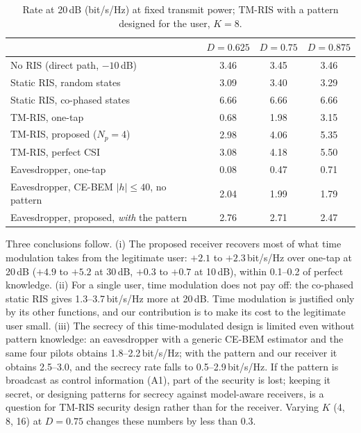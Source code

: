 \begin{table}[!htbp]\centering
\caption{Rate at 20\,dB (bit/s/Hz) at fixed transmit power; TM-RIS with a pattern designed for the user, $K=8$.}\label{tab:motiv}
\begin{tabular}{lccc}\toprule
 & $D=0.625$ & $D=0.75$ & $D=0.875$ \\\midrule
No RIS (direct path, $-10$\,dB) & 3.46 & 3.45 & 3.46 \\
Static RIS, random states & 3.09 & 3.40 & 3.29 \\
Static RIS, co-phased states & 6.66 & 6.66 & 6.66 \\
TM-RIS, one-tap & 0.68 & 1.98 & 3.15 \\
TM-RIS, proposed ($N_p=4$) & 2.98 & 4.06 & 5.35 \\
TM-RIS, perfect CSI & 3.08 & 4.18 & 5.50 \\\midrule
Eavesdropper, one-tap & 0.08 & 0.47 & 0.71 \\
Eavesdropper, CE-BEM $|h|\le40$, no pattern & 2.04 & 1.99 & 1.79 \\
Eavesdropper, proposed, \emph{with} the pattern & 2.76 & 2.71 & 2.47 \\\bottomrule
\end{tabular}
\end{table}

Three conclusions follow. (i) The proposed receiver recovers most of what time modulation takes from the legitimate
user: $+2.1$ to $+2.3$\,bit/s/Hz over one-tap at 20\,dB ($+4.9$ to $+5.2$ at 30\,dB, $+0.3$ to $+0.7$ at 10\,dB), within 0.1--0.2 of
perfect knowledge. (ii) For a single user, time modulation does not pay off: the co-phased static RIS gives 1.3--3.7\,bit/s/Hz
more at 20\,dB. Time modulation is justified only by its other functions, and our contribution is to make its cost to the
legitimate user small. (iii) The secrecy of this time-modulated design is limited even without pattern knowledge: an
eavesdropper with a generic CE-BEM estimator and the same four pilots obtains 1.8--2.2\,bit/s/Hz; with the pattern and our
receiver it obtains 2.5--3.0, and the secrecy rate falls to 0.5--2.9\,bit/s/Hz. If the pattern is broadcast as control
information (A1), part of the security is lost; keeping it secret, or designing patterns for secrecy against
model-aware receivers, is a question for TM-RIS security design rather than for the receiver. Varying $K$ (4, 8, 16) at
$D=0.75$ changes these numbers by less than 0.3.

